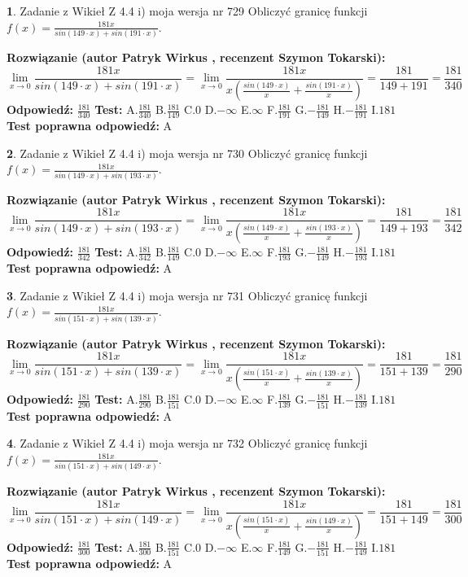 \documentclass[12pt, a4paper]{article}
\theoremstyle{definition} %
\newtheorem{zad}{}
\newcommand{\zadStart}[1]{\begin{zad}#1\newline}
\newcommand{\zadStop}{\end{zad}}
\newcommand{\rozwStart}[2]{\noindent \textbf{Rozwiązanie (autor #1 , recenzent #2): }\newline}
\newcommand{\rozwStop}{\newline}
\newcommand{\odpStart}{\noindent \textbf{Odpowiedź:}\newline}
\newcommand{\odpStop}{\newline}
\newcommand{\testStart}{\noindent \textbf{Test:}\newline}
\newcommand{\testStop}{\newline}
\newcommand{\kluczStart}{\noindent \textbf{Test poprawna odpowiedź:}\newline}
\newcommand{\kluczStop}{\newline}
\begin{document}
\zadStart{Zadanie z Wikieł Z 4.4 i) moja wersja nr 729}
Obliczyć granicę funkcji $f(x)=\frac{181x}{sin(149\cdot x) +sin(191\cdot x)}$.
\zadStop
\rozwStart{Patryk Wirkus}{Szymon Tokarski}
$$\lim\limits_{x\to 0}\frac{181x}{sin(149\cdot x) +sin(191\cdot x)}=\lim\limits_{x\to 0}\frac{181x}{x(\frac{sin(149\cdot x)}{x}+\frac{sin(191\cdot x)}{x})}=\frac{181}{149+191} = \frac{181}{340}$$
\rozwStop
\odpStart
$\frac{181}{340}$
\odpStop
\testStart
A.$\frac{181}{340}$
B.$\frac{181}{149}$
C.$0$
D.$-\infty$
E.$\infty$
F.$\frac{181}{191}$
G.$-\frac{181}{149}$
H.$-\frac{181}{191}$
I.$181$
\testStop
\kluczStart
A
\kluczStop



\zadStart{Zadanie z Wikieł Z 4.4 i) moja wersja nr 730}
Obliczyć granicę funkcji $f(x)=\frac{181x}{sin(149\cdot x) +sin(193\cdot x)}$.
\zadStop
\rozwStart{Patryk Wirkus}{Szymon Tokarski}
$$\lim\limits_{x\to 0}\frac{181x}{sin(149\cdot x) +sin(193\cdot x)}=\lim\limits_{x\to 0}\frac{181x}{x(\frac{sin(149\cdot x)}{x}+\frac{sin(193\cdot x)}{x})}=\frac{181}{149+193} = \frac{181}{342}$$
\rozwStop
\odpStart
$\frac{181}{342}$
\odpStop
\testStart
A.$\frac{181}{342}$
B.$\frac{181}{149}$
C.$0$
D.$-\infty$
E.$\infty$
F.$\frac{181}{193}$
G.$-\frac{181}{149}$
H.$-\frac{181}{193}$
I.$181$
\testStop
\kluczStart
A
\kluczStop



\zadStart{Zadanie z Wikieł Z 4.4 i) moja wersja nr 731}
Obliczyć granicę funkcji $f(x)=\frac{181x}{sin(151\cdot x) +sin(139\cdot x)}$.
\zadStop
\rozwStart{Patryk Wirkus}{Szymon Tokarski}
$$\lim\limits_{x\to 0}\frac{181x}{sin(151\cdot x) +sin(139\cdot x)}=\lim\limits_{x\to 0}\frac{181x}{x(\frac{sin(151\cdot x)}{x}+\frac{sin(139\cdot x)}{x})}=\frac{181}{151+139} = \frac{181}{290}$$
\rozwStop
\odpStart
$\frac{181}{290}$
\odpStop
\testStart
A.$\frac{181}{290}$
B.$\frac{181}{151}$
C.$0$
D.$-\infty$
E.$\infty$
F.$\frac{181}{139}$
G.$-\frac{181}{151}$
H.$-\frac{181}{139}$
I.$181$
\testStop
\kluczStart
A
\kluczStop



\zadStart{Zadanie z Wikieł Z 4.4 i) moja wersja nr 732}
Obliczyć granicę funkcji $f(x)=\frac{181x}{sin(151\cdot x) +sin(149\cdot x)}$.
\zadStop
\rozwStart{Patryk Wirkus}{Szymon Tokarski}
$$\lim\limits_{x\to 0}\frac{181x}{sin(151\cdot x) +sin(149\cdot x)}=\lim\limits_{x\to 0}\frac{181x}{x(\frac{sin(151\cdot x)}{x}+\frac{sin(149\cdot x)}{x})}=\frac{181}{151+149} = \frac{181}{300}$$
\rozwStop
\odpStart
$\frac{181}{300}$
\odpStop
\testStart
A.$\frac{181}{300}$
B.$\frac{181}{151}$
C.$0$
D.$-\infty$
E.$\infty$
F.$\frac{181}{149}$
G.$-\frac{181}{151}$
H.$-\frac{181}{149}$
I.$181$
\testStop
\kluczStart
A
\kluczStop
\end{document}

